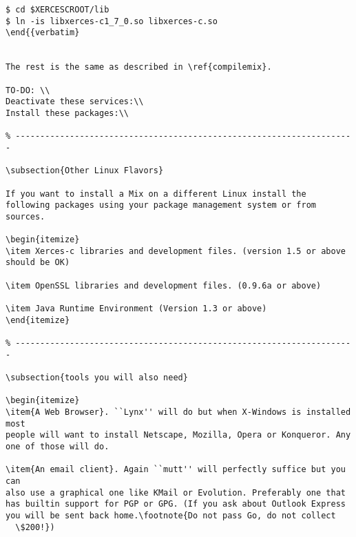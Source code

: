 \documentclass{article}
\begin{document}
\begin{verbatim}
$ cd $XERCESCROOT/lib
$ ln -is libxerces-c1_7_0.so libxerces-c.so
\end{{verbatim}


The rest is the same as described in \ref{compilemix}.

TO-DO: \\
Deactivate these services:\\
Install these packages:\\

% ---------------------------------------------------------------------

\subsection{Other Linux Flavors}

If you want to install a Mix on a different Linux install the
following packages using your package management system or from sources.

\begin{itemize}
\item Xerces-c libraries and development files. (version 1.5 or above should be OK)

\item OpenSSL libraries and development files. (0.9.6a or above)

\item Java Runtime Environment (Version 1.3 or above)
\end{itemize}

% ---------------------------------------------------------------------

\subsection{tools you will also need}

\begin{itemize}
\item{A Web Browser}. ``Lynx'' will do but when X-Windows is installed most
people will want to install Netscape, Mozilla, Opera or Konqueror. Any
one of those will do.

\item{An email client}. Again ``mutt'' will perfectly suffice but you can
also use a graphical one like KMail or Evolution. Preferably one that
has builtin support for PGP or GPG. (If you ask about Outlook Express
you will be sent back home.\footnote{Do not pass Go, do not collect
  \$200!})


\end{verbatim}
\end{document}
